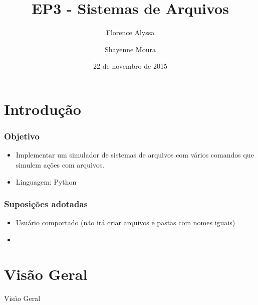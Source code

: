 \documentclass{beamer}
\title{EP3 - Sistemas de Arquivos} %
\author{Florence Alyssa \and Shayenne Moura} %
\institute[USP] %
{
Sistemas Operacionais
 \\ Bacharelado em Ciência da Computação%
\medskip
\textit{} %
}
\date{22 de novembro de 2015} %
\begin{document}
\begin{frame}
\titlepage %
\end{frame}


\section{Introdução} 
\begin{frame}
\frametitle{Objetivo}
\begin{itemize}
\item Implementar um simulador de sistemas de arquivos com vários comandos que simulem ações com arquivos.
\newline

\item Linguagem: Python
\end{itemize}

\end{frame}

\begin{frame}
\frametitle{Suposições adotadas}
\begin{itemize}
\item Usuário comportado (não irá criar arquivos e pastas com nomes iguais)
\item 
\end{itemize}
\end{frame}

\section{Visão Geral} 
\begin{frame}
\begin{LARGE}
\begin{center}
Visão Geral
\end{center}
\end{LARGE}
\end{frame}

\end{document}
